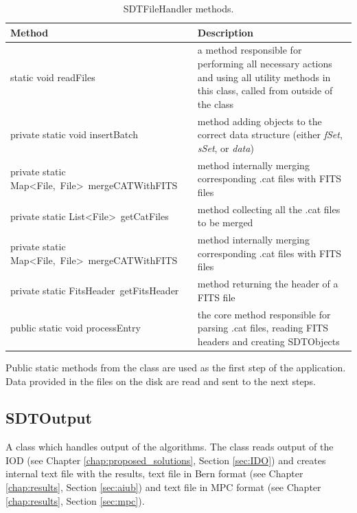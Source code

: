 \begin{table}[H]
\centering
\setlength{\extrarowheight}{2pt}
\begin{tabularx}{\textwidth}{|X|X|}
\hline
\textbf{Method} & \textbf{Description} \\ \hline
static void \mbox{readFiles} & a method responsible for performing all necessary actions and using all utility methods in this class, called from outside of the class \\ \hline
private static void \mbox{insertBatch} & method adding objects to the correct data structure (either \emph{fSet}, \emph{sSet}, or \emph{data}) \\ \hline
private static \mbox{Map<File, File> mergeCATWithFITS} & method internally merging corresponding .cat files with FITS files \\ \hline
private static \mbox{List<File> getCatFiles} & method collecting all the .cat files to be merged \\ \hline
private static \mbox{Map<File, File> mergeCATWithFITS} & method internally merging corresponding .cat files with FITS files \\ \hline
private static \mbox{FitsHeader getFitsHeader} & method returning the header of a FITS file \\ \hline
public static void \mbox{processEntry} & the core method responsible for parsing .cat files, reading FITS headers and creating SDTObjects \\ \hline
\end{tabularx}
\caption{SDTFileHandler methods.}
\label{tab:class_methods_FH}
\end{table}

	Public static methods from the class are used as the first step of the application. Data provided in the files on the disk are read and sent to the next steps.
	
\newpage
	
\subsection{SDTOutput}\label{sec:output}

	A class which handles output of the algorithms. The class reads output of the IOD (see Chapter \ref{chap:proposed_solutions}, Section \ref{sec:IDO}) and creates internal text file with the results, text file in Bern format (see Chapter \ref{chap:results}, Section \ref{sec:aiub}) and text file in MPC format (see Chapter \ref{chap:results}, Section \ref{sec:mpc}).
	

